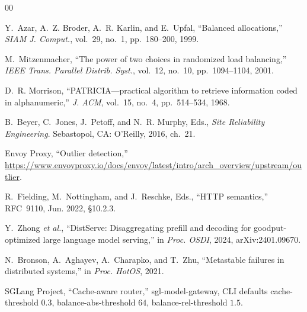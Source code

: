 \documentclass[journal,onecolumn]{IEEEtran}
\begin{document}
\begin{thebibliography}{00}

Y.~Azar, A.~Z. Broder, A.~R. Karlin, and E.~Upfal, ``Balanced allocations,''
\emph{SIAM J. Comput.}, vol.~29, no.~1, pp.~180--200, 1999.

M.~Mitzenmacher, ``The power of two choices in randomized load balancing,''
\emph{IEEE Trans. Parallel Distrib. Syst.}, vol.~12, no.~10, pp.~1094--1104, 2001.

D.~R. Morrison, ``PATRICIA---practical algorithm to retrieve information
coded in alphanumeric,'' \emph{J. ACM}, vol.~15, no.~4, pp.~514--534, 1968.

B.~Beyer, C.~Jones, J.~Petoff, and N.~R. Murphy, Eds.,
\emph{Site Reliability Engineering}. Sebastopol, CA: O'Reilly, 2016, ch.~21.

Envoy Proxy, ``Outlier detection,''
\url{https://www.envoyproxy.io/docs/envoy/latest/intro/arch_overview/upstream/outlier}.

R.~Fielding, M.~Nottingham, and J.~Reschke, Eds., ``HTTP semantics,''
RFC~9110, Jun. 2022, §10.2.3.

Y.~Zhong \emph{et al.}, ``DistServe: Disaggregating prefill and decoding
for goodput-optimized large language model serving,'' in \emph{Proc. OSDI},
2024, arXiv:2401.09670.

N.~Bronson, A.~Aghayev, A.~Charapko, and T.~Zhu, ``Metastable failures in
distributed systems,'' in \emph{Proc. HotOS}, 2021.

SGLang Project, ``Cache-aware router,'' sgl-model-gateway,
CLI defaults cache-threshold $0.3$,
balance-abs-threshold $64$,
balance-rel-threshold $1.5$.

\end{thebibliography}
\end{document}
